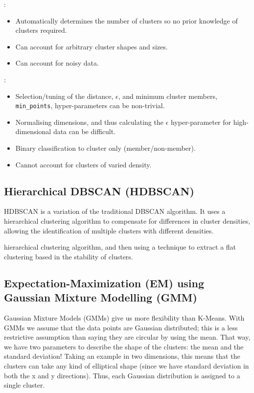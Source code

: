 \vspace{10pt}

: 
\begin{itemize}
    \item Automatically determines the number of clusters so no prior knowledge of clusters required.
    \item Can account for arbitrary cluster shapes and sizes.
    \item Can account for noisy data.
\end{itemize} 

: 
\begin{itemize}
    \item Selection/tuning of the distance, $\epsilon$, and minimum cluster members, \texttt{min\_points}, hyper-parameters can be non-trivial.
    \item Normalising dimensions, and thus calculating the $\epsilon$ hyper-parameter for high-dimensional data can be difficult.
    \item Binary classification to cluster only (member/non-member).
    \item Cannot account for clusters of varied density.
\end{itemize}

\subsection{Hierarchical DBSCAN (HDBSCAN)}

HDBSCAN is a variation of the traditional DBSCAN algorithm. It uses a hierarchical clustering algorithm to compensate for differences in cluster densities, allowing the identification of multiple clusters with different densities. 

hierarchical clustering algorithm, and then using a technique to extract a flat clustering based in the stability of clusters.

\subsection{Expectation-Maximization (EM) using Gaussian Mixture Modelling (GMM)}

Gaussian Mixture Models (GMMs) give us more flexibility than K-Means. With GMMs we assume that the data points are Gaussian distributed; this is a less restrictive assumption than saying they are circular by using the mean. That way, we have two parameters to describe the shape of the clusters: the mean and the standard deviation! Taking an example in two dimensions, this means that the clusters can take any kind of elliptical shape (since we have standard deviation in both the x and y directions). Thus, each Gaussian distribution is assigned to a single cluster.

